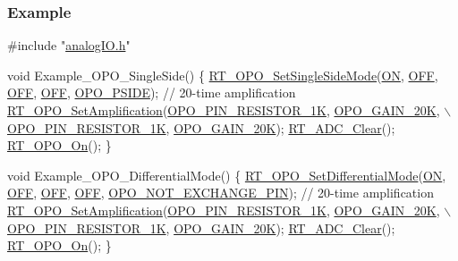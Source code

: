 \subsubsection*{Example}


\begin{DoxyCode}
\textcolor{preprocessor}{#include "\mbox{\hyperlink{a00002}{analogIO.h}}"}

\textcolor{keywordtype}{void} Example\_OPO\_SingleSide()
\{
    \mbox{\hyperlink{a00002_a6438defc0d6280f2b5baedc039f2e314}{RT\_OPO\_SetSingleSideMode}}(\mbox{\hyperlink{a00020_ad76d1750a6cdeebd506bfcd6752554d2}{ON}}, \mbox{\hyperlink{a00020_a29e413f6725b2ba32d165ffaa35b01e5}{OFF}}, \mbox{\hyperlink{a00020_a29e413f6725b2ba32d165ffaa35b01e5}{OFF}}, \mbox{\hyperlink{a00020_a29e413f6725b2ba32d165ffaa35b01e5}{OFF}}, 
      \mbox{\hyperlink{a00002_afb2207320139ac264d5cc1600d3cae9ea740f1053bc0489a53c4cfe9bfc3de403}{OPO\_PSIDE}});
    \textcolor{comment}{// 20-time amplification}
    \mbox{\hyperlink{a00002_ab2a6c21c91c7f05f3de9fefbd30ff95b}{RT\_OPO\_SetAmplification}}(\mbox{\hyperlink{a00002_a4600c8687e3e17269633cb3fbd771af9a7b2e9c0067b4d8197ded8832c5615120}{OPO\_PIN\_RESISTOR\_1K}}, 
      \mbox{\hyperlink{a00002_a6424f6db97a2e691b73af9c4053f1650a44bf632448f2bed40aad8456d4ab211e}{OPO\_GAIN\_20K}}, \(\backslash\)
                            \mbox{\hyperlink{a00002_a4600c8687e3e17269633cb3fbd771af9a7b2e9c0067b4d8197ded8832c5615120}{OPO\_PIN\_RESISTOR\_1K}}, \mbox{\hyperlink{a00002_a6424f6db97a2e691b73af9c4053f1650a44bf632448f2bed40aad8456d4ab211e}{OPO\_GAIN\_20K}});
    \mbox{\hyperlink{a00002_a6f788ef3b57dbc478ab10de7356574fa}{RT\_ADC\_Clear}}();
    \mbox{\hyperlink{a00002_a6304dd2bf95eefdafda9caa159beafdc}{RT\_OPO\_On}}();
\}

\textcolor{keywordtype}{void} Example\_OPO\_DifferentialMode()
\{
    \mbox{\hyperlink{a00002_aadbc9c89735814445f0dc8d4b4eb3e54}{RT\_OPO\_SetDifferentialMode}}(\mbox{\hyperlink{a00020_ad76d1750a6cdeebd506bfcd6752554d2}{ON}}, \mbox{\hyperlink{a00020_a29e413f6725b2ba32d165ffaa35b01e5}{OFF}}, \mbox{\hyperlink{a00020_a29e413f6725b2ba32d165ffaa35b01e5}{OFF}}, 
      \mbox{\hyperlink{a00020_a29e413f6725b2ba32d165ffaa35b01e5}{OFF}}, \mbox{\hyperlink{a00002_af0663f5e9fee7a904ad95d1a4ecdaebda4c251187b10da59c8696dbf4951b49d3}{OPO\_NOT\_EXCHANGE\_PIN}});
    \textcolor{comment}{// 20-time amplification}
    \mbox{\hyperlink{a00002_ab2a6c21c91c7f05f3de9fefbd30ff95b}{RT\_OPO\_SetAmplification}}(\mbox{\hyperlink{a00002_a4600c8687e3e17269633cb3fbd771af9a7b2e9c0067b4d8197ded8832c5615120}{OPO\_PIN\_RESISTOR\_1K}}, 
      \mbox{\hyperlink{a00002_a6424f6db97a2e691b73af9c4053f1650a44bf632448f2bed40aad8456d4ab211e}{OPO\_GAIN\_20K}}, \(\backslash\)
                            \mbox{\hyperlink{a00002_a4600c8687e3e17269633cb3fbd771af9a7b2e9c0067b4d8197ded8832c5615120}{OPO\_PIN\_RESISTOR\_1K}}, \mbox{\hyperlink{a00002_a6424f6db97a2e691b73af9c4053f1650a44bf632448f2bed40aad8456d4ab211e}{OPO\_GAIN\_20K}});
    \mbox{\hyperlink{a00002_a6f788ef3b57dbc478ab10de7356574fa}{RT\_ADC\_Clear}}();
    \mbox{\hyperlink{a00002_a6304dd2bf95eefdafda9caa159beafdc}{RT\_OPO\_On}}();
\}


\end{DoxyCode}
